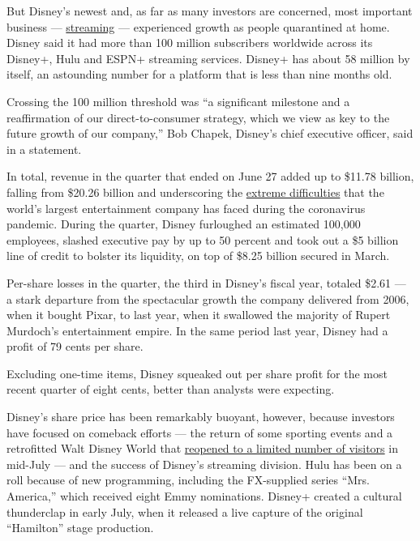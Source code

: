 But Disney's newest and, as far as many investors are concerned, most
important business ---
\href{https://www.nytimes3xbfgragh.onion/2020/04/08/business/disney-plus-50-million-subscribers.html}{streaming}
--- experienced growth as people quarantined at home. Disney said it had
more than 100 million subscribers worldwide across its Disney+, Hulu and
ESPN+ streaming services. Disney+ has about 58 million by itself, an
astounding number for a platform that is less than nine months old.

Crossing the 100 million threshold was ``a significant milestone and a
reaffirmation of our direct-to-consumer strategy, which we view as key
to the future growth of our company,'' Bob Chapek, Disney's chief
executive officer, said in a statement.

In total, revenue in the quarter that ended on June 27 added up to
\$11.78 billion, falling from \$20.26 billion and underscoring the
\href{https://www.nytimes3xbfgragh.onion/2020/05/04/business/media/coronavirus-disney.html}{extreme
difficulties} that the world's largest entertainment company has faced
during the coronavirus pandemic. During the quarter, Disney furloughed
an estimated 100,000 employees, slashed executive pay by up to 50
percent and took out a \$5 billion line of credit to bolster its
liquidity, on top of \$8.25 billion secured in March.

Per-share losses in the quarter, the third in Disney's fiscal year,
totaled \$2.61 --- a stark departure from the spectacular growth the
company delivered from 2006, when it bought Pixar, to last year, when it
swallowed the majority of Rupert Murdoch's entertainment empire. In the
same period last year, Disney had a profit of 79 cents per share.

Excluding one-time items, Disney squeaked out per share profit for the
most recent quarter of eight cents, better than analysts were expecting.

Disney's share price has been remarkably buoyant, however, because
investors have focused on comeback efforts --- the return of some
sporting events and a retrofitted Walt Disney World that
\href{https://www.nytimes3xbfgragh.onion/2020/07/11/business/florida-coronavirus-disney-world-reopening.html}{reopened
to a limited number of visitors} in mid-July --- and the success of
Disney's streaming division. Hulu has been on a roll because of new
programming, including the FX-supplied series ``Mrs. America,'' which
received eight Emmy nominations. Disney+ created a cultural thunderclap
in early July, when it released a live capture of the original
``Hamilton'' stage production.


